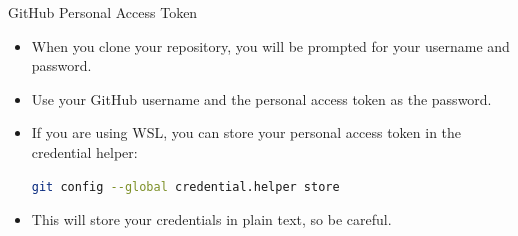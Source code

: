 \documentclass[14pt,aspectratio=1610]{beamer}
\begin{document}
\begin{frame}[fragile]{GitHub Personal Access Token}
  \begin{itemize}
    \item When you clone your repository, you will be prompted for your username and password.
    \item Use your GitHub username and the personal access token as the password.
    \item If you are using WSL, you can store your personal access token in the credential helper:
\begin{lstlisting}[language=bash]
git config --global credential.helper store
\end{lstlisting}
    \item This will store your credentials in plain text, so be careful.
  \end{itemize}
\end{frame}
\end{document}
